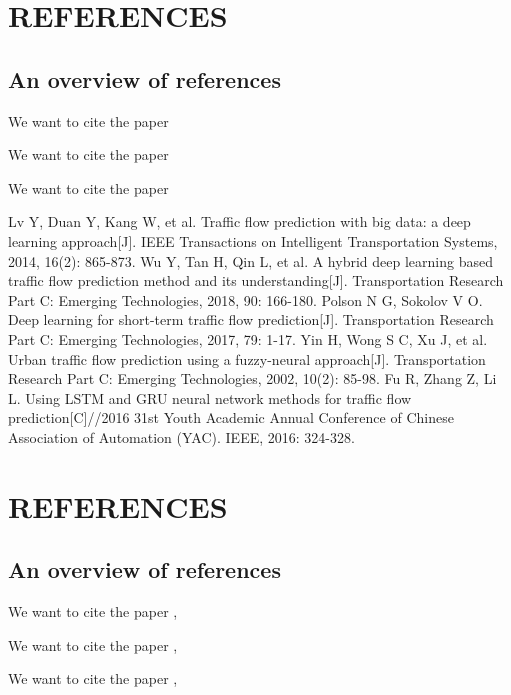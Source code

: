 \documentclass{article}
\begin{document}
    \section{REFERENCES}
    \subsection{An overview of references}
    We want to cite the paper \cite{ref1} \par
    We want to cite the paper \cite{ref1,ref2,ref5} \par
    We want to cite the paper \cite{ref1,ref2,ref3}
    
    \begin{thebibliography}{100}

    Lv Y, Duan Y, Kang W, et al. Traffic flow prediction with big data: a deep learning approach[J]. IEEE Transactions on Intelligent Transportation Systems, 2014, 16(2): 865-873.
    Wu Y, Tan H, Qin L, et al. A hybrid deep learning based traffic flow prediction method and its understanding[J]. Transportation Research Part C: Emerging Technologies, 2018, 90: 166-180.
    Polson N G, Sokolov V O. Deep learning for short-term traffic flow prediction[J]. Transportation Research Part C: Emerging Technologies, 2017, 79: 1-17.
    Yin H, Wong S C, Xu J, et al. Urban traffic flow prediction using a fuzzy-neural approach[J]. Transportation Research Part C: Emerging Technologies, 2002, 10(2): 85-98.
    Fu R, Zhang Z, Li L. Using LSTM and GRU neural network methods for traffic flow prediction[C]//2016 31st Youth Academic Annual Conference of Chinese Association of Automation (YAC). IEEE, 2016: 324-328.
    
    \end{thebibliography}
    

    \section{REFERENCES}
    \subsection{An overview of references}
    We want to cite the paper \cite{2015Traffic}, \par
    We want to cite the paper \cite{2017Traffic, 2019Big, 2019Deep}, \par
    We want to cite the paper \cite{2017Traffic, Hong2014Deep}, \par


    
\end{document}
